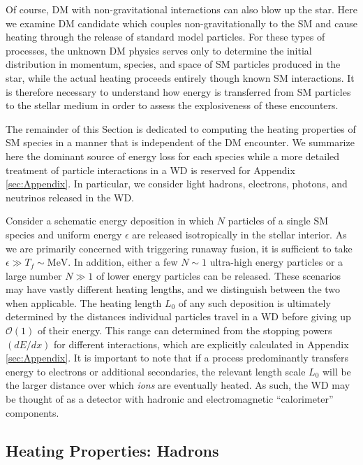 \documentclass[preprintnumbers,amsmath,amssymb,prd, superscriptaddress,twocolumn]{revtex4}
\newcommand{\OO}{\mathcal{O}}
\begin{document}
Of course, DM with non-gravitational interactions can also blow up the star. 
Here we examine DM candidate which couples non-gravitationally to the SM and cause heating through the release of standard model particles. 
For these types of processes, the unknown DM physics serves only to determine the initial distribution in momentum, species, and space of SM particles produced in the star, while the actual heating proceeds entirely though known SM interactions.
It is therefore necessary to understand how energy is transferred from SM particles to the stellar medium in order to assess the explosiveness of these encounters.

The remainder of this Section is dedicated to computing the heating properties of SM species in a manner that is independent of the DM encounter.
We summarize here the dominant source of energy loss for each species while a more detailed treatment of particle interactions in a WD is reserved for Appendix \ref{sec:Appendix}. In particular, we consider light hadrons, electrons, photons, and neutrinos released in the WD.

Consider a schematic energy deposition in which $N$ particles of a single SM species and uniform energy $\epsilon$ are released isotropically in the stellar interior.
As we are primarily concerned with triggering runaway fusion, it is sufficient to take $\epsilon \gg T_f \sim \text{MeV}$.
In addition, either a few $N \sim 1$ ultra-high energy particles or a large number $N \gg 1$ of lower energy particles can be released.
These scenarios may have vastly different heating lengths, and we distinguish between the two when applicable.
The heating length $L_0$ of any such deposition is ultimately determined by the distances individual particles travel in a WD before giving up $\OO(1)$ of their energy.
This range can determined from the stopping powers $(dE/dx)$ for different interactions, which are explicitly calculated in Appendix \ref{sec:Appendix}.
It is important to note that if a process predominantly transfers energy to electrons or additional secondaries, the relevant length scale $L_0$ will be the larger distance over which \emph{ions} are eventually heated.
As such, the WD may be thought of as a detector with hadronic and electromagnetic ``calorimeter'' components.

\subsection{Heating Properties: Hadrons}
\end{document}

